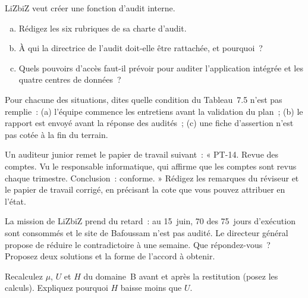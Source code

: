\begin{boxexo}[title={\ding{45}\quad Exercice~7.2. La charte d'audit de LiZbiZ \niveaumoyen}]
LiZbiZ veut créer une fonction d'audit interne.
\begin{enumerate}[(a)]
    \item Rédigez les six rubriques de sa charte d'audit.
    \item À qui la directrice de l'audit doit-elle être rattachée, et
          pourquoi~?
    \item Quels pouvoirs d'accès faut-il prévoir pour auditer l'application
          intégrée et les quatre centres de données~?
\end{enumerate}
\end{boxexo}

\begin{boxexo}[title={\ding{45}\quad Exercice~7.3. Entrées et sorties \niveaubase}]
Pour chacune des situations, dites quelle condition du Tableau~7.5 n'est
pas remplie~: (a) l'équipe commence les entretiens avant la validation du
plan~; (b) le rapport est envoyé avant la réponse des audités~; (c) une
fiche d'assertion n'est pas cotée à la fin du terrain.
\end{boxexo}

\begin{boxexo}[title={\ding{45}\quad Exercice~7.4. Revoir un papier de travail \niveaumoyen}]
Un auditeur junior remet le papier de travail suivant~: « PT-14. Revue des
comptes. Vu le responsable informatique, qui affirme que les comptes sont
revus chaque trimestre. Conclusion~: conforme. » Rédigez les remarques du
réviseur et le papier de travail corrigé, en précisant la cote que vous
pouvez attribuer en l'état.
\end{boxexo}

\begin{boxexo}[title={\ding{45}\quad Exercice~7.5. Le budget \niveaumoyen}]
La mission de LiZbiZ prend du retard~: au 15~juin, 70 des 75~jours
d'exécution sont consommés et le site de Bafoussam n'est pas audité. Le
directeur général propose de réduire le contradictoire à une semaine.
Que répondez-vous~? Proposez deux solutions et la forme de l'accord à
obtenir.
\end{boxexo}

\begin{boxexo}[title={\ding{45}\quad Exercice~7.6. Le contradictoire chiffré \niveaumoyen}]
Recalculez $\mu$, $U$ et $H$ du domaine~B avant et après la restitution
(posez les calculs). Expliquez pourquoi $H$ baisse moins que $U$.
\end{boxexo}

